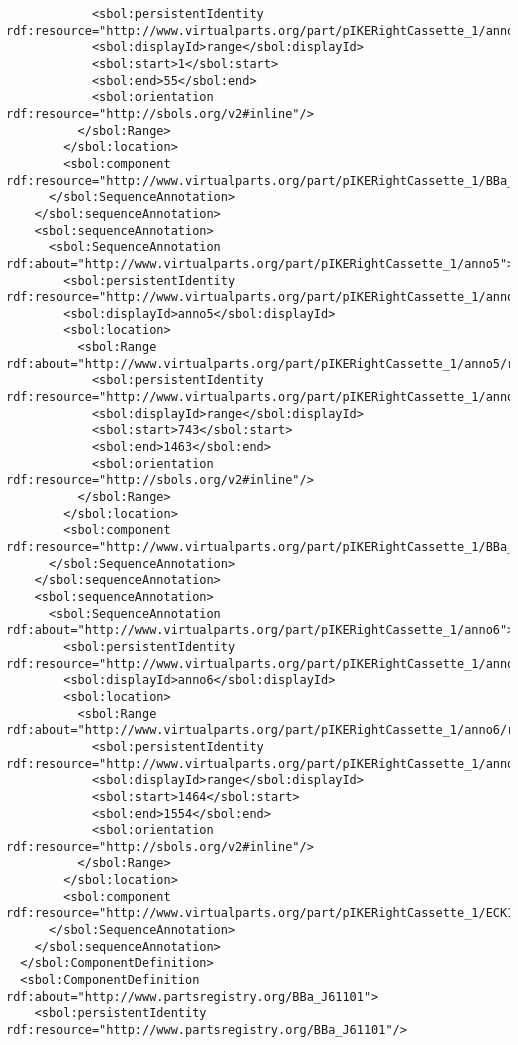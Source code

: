 \begin{lstlisting}
            <sbol:persistentIdentity rdf:resource="http://www.virtualparts.org/part/pIKERightCassette_1/anno1/range"/>
            <sbol:displayId>range</sbol:displayId>
            <sbol:start>1</sbol:start>
            <sbol:end>55</sbol:end>
            <sbol:orientation rdf:resource="http://sbols.org/v2#inline"/>
          </sbol:Range>
        </sbol:location>
        <sbol:component rdf:resource="http://www.virtualparts.org/part/pIKERightCassette_1/BBa_R0010"/>
      </sbol:SequenceAnnotation>
    </sbol:sequenceAnnotation>
    <sbol:sequenceAnnotation>
      <sbol:SequenceAnnotation rdf:about="http://www.virtualparts.org/part/pIKERightCassette_1/anno5">
        <sbol:persistentIdentity rdf:resource="http://www.virtualparts.org/part/pIKERightCassette_1/anno5"/>
        <sbol:displayId>anno5</sbol:displayId>
        <sbol:location>
          <sbol:Range rdf:about="http://www.virtualparts.org/part/pIKERightCassette_1/anno5/range">
            <sbol:persistentIdentity rdf:resource="http://www.virtualparts.org/part/pIKERightCassette_1/anno5/range"/>
            <sbol:displayId>range</sbol:displayId>
            <sbol:start>743</sbol:start>
            <sbol:end>1463</sbol:end>
            <sbol:orientation rdf:resource="http://sbols.org/v2#inline"/>
          </sbol:Range>
        </sbol:location>
        <sbol:component rdf:resource="http://www.virtualparts.org/part/pIKERightCassette_1/BBa_E0040"/>
      </sbol:SequenceAnnotation>
    </sbol:sequenceAnnotation>
    <sbol:sequenceAnnotation>
      <sbol:SequenceAnnotation rdf:about="http://www.virtualparts.org/part/pIKERightCassette_1/anno6">
        <sbol:persistentIdentity rdf:resource="http://www.virtualparts.org/part/pIKERightCassette_1/anno6"/>
        <sbol:displayId>anno6</sbol:displayId>
        <sbol:location>
          <sbol:Range rdf:about="http://www.virtualparts.org/part/pIKERightCassette_1/anno6/range">
            <sbol:persistentIdentity rdf:resource="http://www.virtualparts.org/part/pIKERightCassette_1/anno6/range"/>
            <sbol:displayId>range</sbol:displayId>
            <sbol:start>1464</sbol:start>
            <sbol:end>1554</sbol:end>
            <sbol:orientation rdf:resource="http://sbols.org/v2#inline"/>
          </sbol:Range>
        </sbol:location>
        <sbol:component rdf:resource="http://www.virtualparts.org/part/pIKERightCassette_1/ECK120033736"/>
      </sbol:SequenceAnnotation>
    </sbol:sequenceAnnotation>
  </sbol:ComponentDefinition>
  <sbol:ComponentDefinition rdf:about="http://www.partsregistry.org/BBa_J61101">
    <sbol:persistentIdentity rdf:resource="http://www.partsregistry.org/BBa_J61101"/>

\end{lstlisting}
